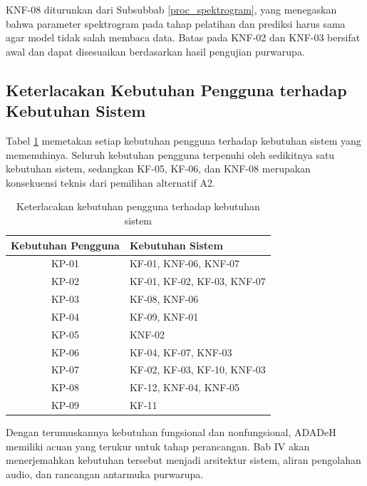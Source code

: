 KNF-08 diturunkan dari Subsubbab \ref{proc_spektrogram}, yang menegaskan bahwa parameter spektrogram pada tahap pelatihan dan prediksi harus sama agar model tidak salah membaca data. Batas pada KNF-02 dan KNF-03 bersifat awal dan dapat disesuaikan berdasarkan hasil pengujian purwarupa.

\subsection{Keterlacakan Kebutuhan Pengguna terhadap Kebutuhan Sistem}
\label{keterlacakan_ks}

Tabel \ref{tab:kp_ks} memetakan setiap kebutuhan pengguna terhadap kebutuhan sistem yang memenuhinya. Seluruh kebutuhan pengguna terpenuhi oleh sedikitnya satu kebutuhan sistem, sedangkan KF-05, KF-06, dan KNF-08 merupakan konsekuensi teknis dari pemilihan alternatif A2.

\begin{table}[t]
  \centering
  \small
  \caption{Keterlacakan kebutuhan pengguna terhadap kebutuhan sistem}
  \label{tab:kp_ks}
  \renewcommand{\arraystretch}{1.2}
  \begin{tabularx}{0.85\textwidth}{| c | X |}
    \hline
    \textbf{Kebutuhan Pengguna} & \textbf{Kebutuhan Sistem} \\
    \hline
    KP-01 & KF-01, KNF-06, KNF-07 \\
    KP-02 & KF-01, KF-02, KF-03, KNF-07 \\
    KP-03 & KF-08, KNF-06 \\
    KP-04 & KF-09, KNF-01 \\
    KP-05 & KNF-02 \\
    KP-06 & KF-04, KF-07, KNF-03 \\
    KP-07 & KF-02, KF-03, KF-10, KNF-03 \\
    KP-08 & KF-12, KNF-04, KNF-05 \\
    KP-09 & KF-11 \\
    \hline
  \end{tabularx}
\end{table}

Dengan terumuskannya kebutuhan fungsional dan nonfungsional, ADADeH memiliki acuan yang terukur untuk tahap perancangan. Bab IV akan menerjemahkan kebutuhan tersebut menjadi arsitektur sistem, aliran pengolahan audio, dan rancangan antarmuka purwarupa.